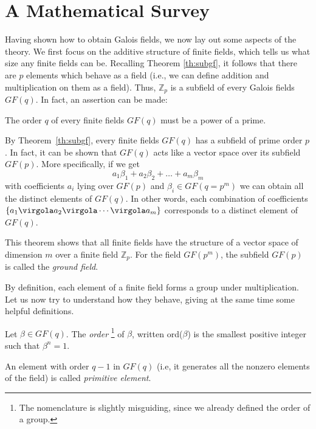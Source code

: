 \section{A Mathematical Survey} \label{sec:MathSurvey}
Having shown how to obtain Galois fields, we now lay out some aspects of the theory. We first focus on the additive structure of finite fields, which tells us what size any finite fields can be. Recalling Theorem \ref{th:subgf}, it follows that there are $p$ elements which behave as a field (i.e., we can define addition and multiplication on them as a field). Thus, \( \mathbb Z_p\) is a subfield of every Galois fields $GF(q)$. In fact, an assertion can be made:

\begin{Theorem}
The order $q$ of every finite fields $GF(q)$ must be a power of a prime.
\end{Theorem}

By Theorem~\ref{th:subgf}, every finite fields $GF(q)$ has a subfield of prime order $p$. In fact, it can be shown that $GF(q)$ acts like a vector space over its subfield $GF(p)$. More specifically, if we get
\begin{equation}
a_1\beta_1 + a_2\beta_2 + \ldots + a_m\beta_m
\end{equation}
with coefficients \(a_i\) lying over $GF(p)$ and $\beta_i \in GF(q=p^m)$ we can obtain all the distinct elements of $GF(q)$. In other words, each combination of coefficients \( \{a_1 \virgola a_2 \virgola \cdots \virgola a_m\}\) corresponds to a distinct element of $GF(q)$.

This theorem shows that all finite fields have the structure of a vector space of dimension $m$ over a finite field \( \mathbb Z_p\). For the field $GF(p^m)$, the subfield $GF(p)$ is called the \emph{ground field}.

By definition, each element of a finite field forms a group under multiplication. Let us now try to understand how they behave, giving at the same time some helpful definitions.

\begin{Def}
Let $\beta \in GF(q)$. The \emph{order}  \footnote{The nomenclature is slightly misguiding, since we already defined the order of a group.}
 of $\beta$, written ord($\beta$) is the smallest positive integer such that \(\beta^n=1\).
\end{Def}


\begin{Def}
An element with order $q-1$ in $GF(q)$ (i.e, it generates all the nonzero elements of the field) is called \emph{primitive element}.
\end{Def}

